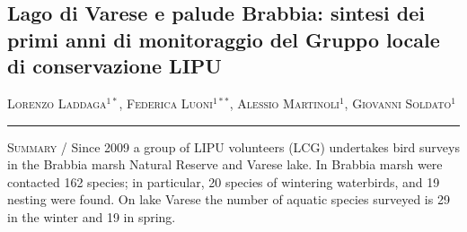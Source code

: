 \setcounter{figure}{0}
\setcounter{table}{0}

\begin{adjustwidth}{-3.5cm}{0cm}
\pagestyle{CIOpage}
\chapter*[Monitoraggio ornitologico del lago di Varese e della
palude Brabbia]{Lago di Varese e palude Brabbia: sintesi dei primi anni di monitoraggio del Gruppo locale di conservazione LIPU}

\textsc{Lorenzo Laddaga}$^{1*}$, \textsc{Federica Luoni}$^{1**}$,
\textsc{Alessio Martinoli}$^{1}$, \textsc{Giovanni Soldato}$^{1}$ \\

   
\noindent\color{MUSEBLUE}\rule{27cm}{2pt}
\vspace{1cm}
\end{adjustwidth}



{\small
\noindent \textsc{\color{MUSEBLUE} Summary} / Since 2009 a group of LIPU volunteers (LCG) undertakes bird surveys in
the Brabbia marsh Natural Reserve and Varese lake. In Brabbia marsh
were contacted 162 species; in particular, 20 species of wintering
waterbirds, and 19 nesting were found. On lake Varese the number of
aquatic species surveyed is 29 in the winter and 19 in spring.
}



